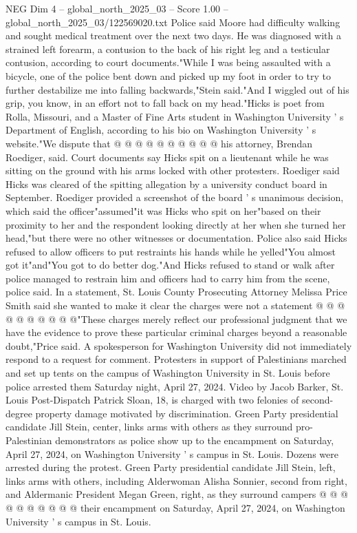 \begin{textsample}{NEG Dim 4 – global\_north\_2025\_03 – Score 1.00 – global\_north\_2025\_03/122569020.txt}
Police said Moore had difficulty walking and sought medical treatment over the next two days.
He was diagnosed with a strained left forearm, a contusion to the back of his right leg and a testicular contusion, according to court documents."While I was being assaulted with a bicycle, one of the police bent down and picked up my foot in order to try to further destabilize me into falling backwards,"Stein said."And I wiggled out of his grip, you know, in an effort not to fall back on my head."Hicks is poet from Rolla, Missouri, and a Master of Fine Arts student in Washington University ' s Department of English, according to his bio on Washington University ' s website."We dispute that @ @ @ @ @ @ @ @ @ @ his attorney, Brendan Roediger, said.
Court documents say Hicks spit on a lieutenant while he was sitting on the ground with his arms locked with other protesters.
Roediger said Hicks was cleared of the spitting allegation by a university conduct board in September.
Roediger provided a screenshot of the board ' s unanimous decision, which said the officer"assumed"it was Hicks who spit on her"based on their proximity to her and the respondent looking directly at her when she turned her head,"but there were no other witnesses or documentation.
Police also said Hicks refused to allow officers to put restraints his hands while he yelled"You almost got it"and"You got to do better dog."And Hicks refused to stand or walk after police managed to restrain him and officers had to carry him from the scene, police said.
In a statement, St.
Louis County Prosecuting Attorney Melissa Price Smith said she wanted to make it clear the charges were not a statement @ @ @ @ @ @ @ @ @ @"These charges merely reflect our professional judgment that we have the evidence to prove these particular criminal charges beyond a reasonable doubt,"Price said.
A spokesperson for Washington University did not immediately respond to a request for comment.
Protesters in support of Palestinians marched and set up tents on the campus of Washington University in St.
Louis before police arrested them Saturday night, April 27, 2024.
Video by Jacob Barker, St.
Louis Post-Dispatch Patrick Sloan, 18, is charged with two felonies of second-degree property damage motivated by discrimination.
Green Party presidential candidate Jill Stein, center, links arms with others as they surround pro-Palestinian demonstrators as police show up to the encampment on Saturday, April 27, 2024, on Washington University ' s campus in St.
Louis.
Dozens were arrested during the protest.
Green Party presidential candidate Jill Stein, left, links arms with others, including Alderwoman Alisha Sonnier, second from right, and Aldermanic President Megan Green, right, as they surround campers @ @ @ @ @ @ @ @ @ @ their encampment on Saturday, April 27, 2024, on Washington University ' s campus in St.
Louis.

\end{textsample}
